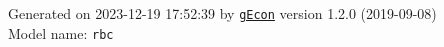 \documentclass[10pt,a4paper]{article}
\numberwithin{equation}{section}
\begin{document}
\begin{landscape}
\begin{flushleft}{\large
Generated  on 2023-12-19 17:52:39 by \href{http://gecon.r-forge.r-project.org/}{\texttt{gEcon}} version 1.2.0 (2019-09-08)\\
Model name: \verb+rbc+
}\end{flushleft}


\end{landscape}

\end{document}
